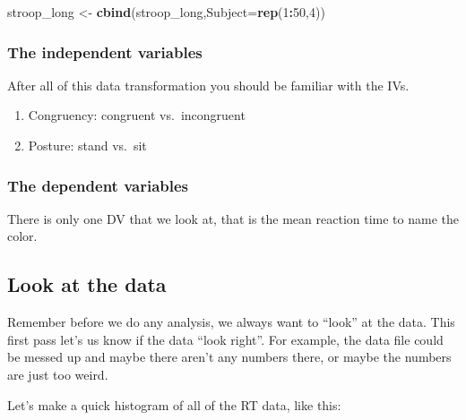 \documentclass[
]{book}
\newenvironment{Shaded}{\begin{snugshade}}{\end{snugshade}}
\newcommand{\AttributeTok}[1]{\textcolor[rgb]{0.13,0.29,0.53}{#1}}
\newcommand{\DecValTok}[1]{\textcolor[rgb]{0.00,0.00,0.81}{#1}}
\newcommand{\FunctionTok}[1]{\textcolor[rgb]{0.13,0.29,0.53}{\textbf{#1}}}
\newcommand{\NormalTok}[1]{#1}
\newcommand{\OtherTok}[1]{\textcolor[rgb]{0.56,0.35,0.01}{#1}}
\newcommand{\SpecialCharTok}[1]{\textcolor[rgb]{0.81,0.36,0.00}{\textbf{#1}}}
\providecommand{\tightlist}{%
  \setlength{\itemsep}{0pt}\setlength{\parskip}{0pt}}
\begin{document}
\begin{Shaded}
\begin{Highlighting}[]
\NormalTok{stroop\_long }\OtherTok{\textless{}{-}} \FunctionTok{cbind}\NormalTok{(stroop\_long,}\AttributeTok{Subject=}\FunctionTok{rep}\NormalTok{(}\DecValTok{1}\SpecialCharTok{:}\DecValTok{50}\NormalTok{,}\DecValTok{4}\NormalTok{))}
\end{Highlighting}
\end{Shaded}

\hypertarget{the-independent-variables}{%
\subsubsection{The independent variables}\label{the-independent-variables}}

After all of this data transformation you should be familiar with the IVs.

\begin{enumerate}
\def\labelenumi{\arabic{enumi}.}
\tightlist
\item
  Congruency: congruent vs.~incongruent
\item
  Posture: stand vs.~sit
\end{enumerate}

\hypertarget{the-dependent-variables-1}{%
\subsubsection{The dependent variables}\label{the-dependent-variables-1}}

There is only one DV that we look at, that is the mean reaction time to name the color.

\hypertarget{look-at-the-data-4}{%
\subsection{Look at the data}\label{look-at-the-data-4}}

Remember before we do any analysis, we always want to ``look'' at the data. This first pass let's us know if the data ``look right''. For example, the data file could be messed up and maybe there aren't any numbers there, or maybe the numbers are just too weird.

Let's make a quick histogram of all of the RT data, like this:

\begin{Shaded}
\end{Shaded}
\end{document}
